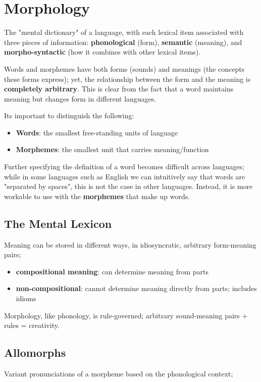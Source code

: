 \documentclass[12pt]{article}
\begin{document}
\section{Morphology}
\begin{definitionEnd}[Lexicon]
  The "mental dictionary" of a language, with each lexical item associated with three pieces of information: \textbf{phonological} (form), \textbf{semantic} (meaning), and \textbf{morpho-syntactic} (how it combines with other lexical items).
\end{definitionEnd}

Words and morphemes have both forms (sounds) and meanings (the concepts these forms express); yet, the relationship between the form and the meaning is \textbf{completely arbitrary}. This is clear from the fact that a word maintains meaning but changes form in different languages.

Its important to distinguish the following:\begin{itemize}
  \item \textbf{Words}: the smallest free-standing units of language
  \item \textbf{Morphemes}: the smallest unit that carries meaning/function
\end{itemize}

Further specifying the definition of a word becomes difficult across languages; while in some languages such as English we can intuitively say that words are "separated by spaces", this is not the case in other languages. Instead, it is more workable to use with the \textbf{morphemes} that make up words.

\subsection{The Mental Lexicon}
Meaning can be stored in different ways, in idiosyncratic, arbitrary form-meaning pairs; \begin{itemize}
  \item \textbf{compositional meaning}: can determine meaning from parts
  \item \textbf{non-compositional}: cannot determine meaning directly from parts; includes idioms
\end{itemize}

Morphology, like phonology, is rule-governed; arbitrary sound-meaning pairs + rules = creativity.

\subsection{Allomorphs}
\begin{definitionEnd}[Allopmorphs]
  Variant pronunciations of a morpheme based on the phonological context; %
\end{definitionEnd}
\end{document}
